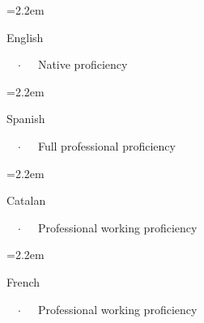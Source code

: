 \documentclass{scrartcl}
\newcommand{\Description}[1]{\noindent\hangindent=2.2em\hangafter=0\noindent\raggedright\footnotesize{#1}\par\normalsize\vspace{1em}} %
\begin{document}
\begin{cv}{}

\vspace{1em} %


\noindent{}\vspace{1em}

\vspace{1em}

\newlength{\langbox} %
\settowidth{\langbox}{English} %

\Description{\parbox{\langbox}{{English}}\ \ $\cdotp$\ \ \ Native proficiency}

\vspace{-0.5em} %

\Description{\parbox{\langbox}{{Spanish}}\ \ $\cdotp$\ \ \ Full professional proficiency}

\vspace{-0.5em} %

\Description{\parbox{\langbox}{{Catalan}}\ \ $\cdotp$\ \ \ Professional working proficiency}
\vspace{-0.5em} %

\Description{\parbox{\langbox}{{French}}\ \ $\cdotp$\ \ \ Professional working proficiency}

\vspace{1em} %

\newpage

\noindent{}\vspace{1em}

\vspace{1em}


\end{cv}
\end{document}
